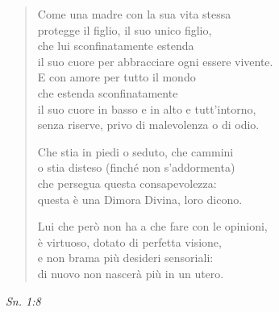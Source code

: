 \begin{quote}
Come una madre con la sua vita stessa \\
protegge il figlio, il suo unico figlio, \\
che lui sconfinatamente estenda \\
il suo cuore per abbracciare ogni essere vivente. \\
E con amore per tutto il mondo \\
che estenda sconfinatamente \\
il suo cuore in basso e in alto e tutt’intorno, \\
senza riserve, privo di malevolenza o di odio.


Che stia in piedi o seduto, che cammini \\
o stia disteso (finché non s’addormenta) \\
che persegua questa consapevolezza: \\
questa è una Dimora Divina, loro dicono.


Lui che però non ha a che fare con le opinioni, \\
è virtuoso, dotato di perfetta visione, \\
e non brama più desideri sensoriali: \\
di nuovo non nascerà più in un utero.
\end{quote}

\emph{Sn. 1:8}


